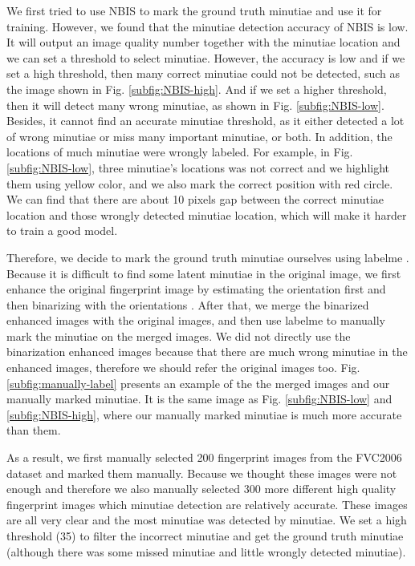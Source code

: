 We first tried to use NBIS \cite{NBIS} to mark the ground truth minutiae and use it for training.
However, we found that the minutiae detection accuracy of NBIS is low.
It will output an image quality number together with the minutiae location and we can set a threshold to select minutiae.
However, the accuracy is low and if we set a high threshold, then many correct minutiae could not be detected, such as the image shown in Fig. \ref{subfig:NBIS-high}.
And if we set a higher threshold, then it will detect many wrong minutiae, as shown in Fig. \ref{subfig:NBIS-low}.
Besides, it cannot find an accurate minutiae threshold, as it either detected a lot of wrong minutiae or miss many important minutiae, or both.
In addition, the locations of much minutiae were wrongly labeled.
For example, in Fig. \ref{subfig:NBIS-low}, three minutiae's locations was not correct and we highlight them using yellow color, and we also mark the correct position with red circle.
We can find that there are about 10 pixels gap between the correct minutiae location and those wrongly detected minutiae location, which will make it harder to train a good model.

Therefore, we decide to mark the ground truth minutiae ourselves using labelme \cite{labelme}.
Because it is difficult to find some latent minutiae in the original image, we first enhance the original fingerprint image by estimating the orientation first and then binarizing with the orientations \cite{caoFingerprintImageEnhancement2017}.
After that, we merge the binarized enhanced images with the original images, and then use labelme to manually mark the minutiae on the merged images.
We did not directly use the binarization enhanced images because that there are much wrong minutiae in the enhanced images, therefore we should refer the original images too.
Fig. \ref{subfig:manually-label} presents an example of the the merged images and our manually marked minutiae.
It is the same image as Fig. \ref{subfig:NBIS-low} and \ref{subfig:NBIS-high}, where our manually marked minutiae is much more accurate than them.

As a result, we first manually selected 200 fingerprint images from the FVC2006 dataset \cite{FVC2006} and marked them manually.
Because we thought these images were not enough and therefore we also manually selected 300 more different high quality fingerprint images which minutiae detection are relatively accurate.
These images are all very clear and the most minutiae was detected by minutiae.
We set a high threshold (35) to filter the incorrect minutiae and get the ground truth minutiae (although there was some missed minutiae and little wrongly detected minutiae).

